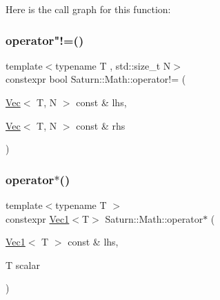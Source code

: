 Here is the call graph for this function\+:
\mbox{\label{namespace_saturn_1_1_math_acf89a2228ab3a5066762791d741943cd}} 
\subsubsection{\texorpdfstring{operator"!=()}{operator!=()}}
{\footnotesize\ttfamily template$<$typename T , std\+::size\+\_\+t N$>$ \\
constexpr bool Saturn\+::\+Math\+::operator!= (\begin{DoxyParamCaption}\item[{\mbox{\hyperlink{class_saturn_1_1_math_1_1_vec}{Vec}}$<$ T, N $>$ const \&}]{lhs,  }\item[{\mbox{\hyperlink{class_saturn_1_1_math_1_1_vec}{Vec}}$<$ T, N $>$ const \&}]{rhs }\end{DoxyParamCaption})}

\mbox{\label{namespace_saturn_1_1_math_a31358268c3450500daebffe0406bf72f}} 
\subsubsection{\texorpdfstring{operator$\ast$()}{operator*()}\hspace{0.1cm}{\footnotesize\ttfamily [1/4]}}
{\footnotesize\ttfamily template$<$typename T $>$ \\
constexpr \mbox{\hyperlink{namespace_saturn_1_1_math_acae4f808f0c3284d0b60ee1ac720deaa}{Vec1}}$<$T$>$ Saturn\+::\+Math\+::operator$\ast$ (\begin{DoxyParamCaption}\item[{\mbox{\hyperlink{namespace_saturn_1_1_math_acae4f808f0c3284d0b60ee1ac720deaa}{Vec1}}$<$ T $>$ const \&}]{lhs,  }\item[{T}]{scalar }\end{DoxyParamCaption})}

\mbox{\label{namespace_saturn_1_1_math_ab149eb158c27cbe7edb4f2939177e2d6}} 
